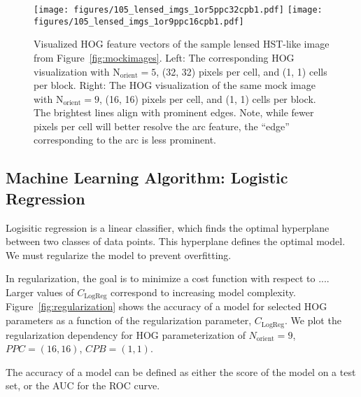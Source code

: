 \documentclass{emulateapj}
\begin{document}
\begin{figure*}[t]\label{fig:hogvisual}
\begin{center}
\texttt{[image: figures/105\_lensed\_imgs\_1or5ppc32cpb1.pdf]}\hspace{-20pt}
\texttt{[image: figures/105\_lensed\_imgs\_1or9ppc16cpb1.pdf]}
\caption{Visualized HOG feature vectors of the sample lensed HST-like
  image from Figure~\ref{fig:mockimages}.  Left: The corresponding HOG
  visualization with N$_\text{orient}=5$, (32, 32) pixels per cell,
  and (1, 1) cells per block.  Right: The HOG visualization of the
  same mock image with N$_\text{orient}=9$, (16, 16) pixels per cell,
  and (1, 1) cells per block.  The brightest lines align with
  prominent edges.  Note, while fewer pixels per cell will better
  resolve the arc feature, the ``edge'' corresponding to the arc is
  less prominent.  }
\end{center}
\end{figure*}


\subsection{Machine Learning Algorithm: Logistic Regression}\label{sec:logreg}

Logisitic regression is a linear classifier, which finds the optimal
hyperplane between two classes of data points.  This hyperplane
defines the optimal model.  We must regularize the model to prevent
overfitting.  

In regularization, the goal is to minimize a cost function with
respect to ....  Larger values of $C_\text{LogReg}$ correspond to
increasing model complexity.  Figure~\ref{fig:regularization} shows
the accuracy of a model for selected HOG parameters as a function of
the regularization parameter, $C_\text{LogReg}$.  We plot the
regularization dependency for HOG parameterization of
$N_\text{orient}=9$, $PPC=(16, 16)$, $CPB=(1,1)$.  

The accuracy of a model can be defined as either the score of the
model on a test set, or the AUC for the ROC curve.


\end{document}
